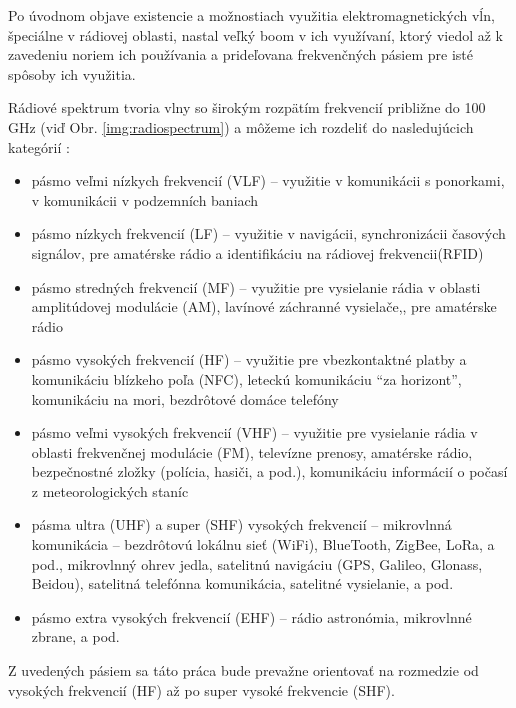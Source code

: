 Po úvodnom objave existencie a možnostiach využitia elektromagnetických vĺn, špeciálne v rádiovej oblasti, nastal veľký boom v ich využívaní, ktorý viedol až k zavedeniu noriem ich používania a prideľovana frekvenčných pásiem pre isté spôsoby ich využitia.


Rádiové spektrum tvoria vlny so širokým rozpätím frekvencií približne do 100 GHz (viď Obr. \ref{img:radiospectrum}) a môžeme ich rozdeliť do nasledujúcich kategórií \cite{itu}:
\begin{itemize}
\item pásmo veľmi nízkych frekvencií (VLF) -- využitie v komunikácii s ponorkami, v komunikácii v podzemních baniach
\item pásmo nízkych frekvencií (LF) -- využitie v navigácii, synchronizácii časových signálov, pre amatérske rádio a identifikáciu na rádiovej frekvencii(RFID)
\item pásmo stredných frekvencií (MF) -- využitie pre vysielanie rádia v oblasti amplitúdovej modulácie (AM), lavínové záchranné vysielače,, pre amatérske rádio
\item pásmo vysokých frekvencií (HF) -- využitie pre vbezkontaktné platby a komunikáciu blízkeho poľa (NFC), leteckú komunikáciu ``za horizont'', komunikáciu na mori, bezdrôtové domáce telefóny
\item pásmo veľmi vysokých frekvencií (VHF) -- využitie pre vysielanie rádia v oblasti frekvenčnej modulácie (FM), televízne prenosy, amatérske rádio, bezpečnostné zložky (polícia, hasiči, a pod.), komunikáciu informácií o počasí z meteorologických staníc
\item pásma ultra (UHF) a super (SHF) vysokých frekvencií -- mikrovlnná komunikácia -- bezdrôtovú lokálnu sieť (WiFi), BlueTooth, ZigBee, LoRa, a pod., mikrovlnný ohrev jedla, satelitnú navigáciu (GPS, Galileo, Glonass, Beidou), satelitná telefónna komunikácia, satelitné vysielanie, a pod.
\item pásmo extra vysokých frekvencií (EHF) -- rádio astronómia, mikrovlnné zbrane, a pod.
\end{itemize}

Z uvedených pásiem sa táto práca bude prevažne orientovať na rozmedzie od vysokých frekvencií (HF) až po super vysoké frekvencie (SHF).


